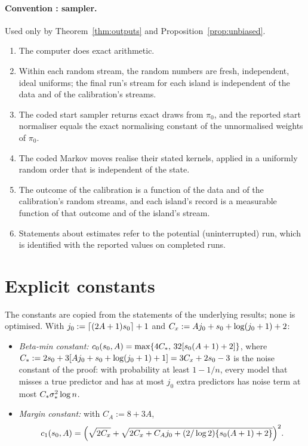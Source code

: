 \paragraph{Convention : sampler.} Used only by Theorem~\ref{thm:outputs} and Proposition~\ref{prop:unbiased}.
\begin{enumerate}[label=(\roman*),leftmargin=2em,itemsep=1pt]
  \item The computer does exact arithmetic.
  \item Within each random stream, the random numbers are fresh, independent, ideal uniforms; the final run's stream for
    each island is independent of the data and of the calibration's streams.
  \item The coded start sampler returns exact draws from $\pi_0$, and the reported start normaliser equals the exact
    normalising constant of the unnormalised weights of $\pi_0$.
  \item The coded Markov moves realise their stated kernels, applied in a uniformly random order that is independent of
    the state.
  \item The outcome of the calibration is a function of the data and of the calibration's random streams, and each island's
    record is a measurable function of that outcome and of the island's stream.
  \item Statements about estimates refer to the potential (uninterrupted) run, which is identified with the reported
    values on completed runs.
\end{enumerate}

\section{Explicit constants}\label{app:constants}

The constants are copied from the statements of the underlying results; none is optimised. With
$j_0:=\lceil(2A+1)s_0\rceil+1$ and $C_x:=Aj_0+s_0+\log(j_0+1)+2$:
\begin{itemize}[leftmargin=1.5em]
  \item \emph{Beta-min constant:} $c_0(s_0,A)=\max\{4C_*,\,32[s_0(A+1)+2]\}$, where
    $C_*:=2s_0+3[Aj_0+s_0+\log(j_0+1)+1]=3C_x+2s_0-3$ is the noise constant of the proof: with probability at least
    $1-1/n$, every model that misses a true predictor and has at most $j_0$ extra predictors has noise term at most
    $C_*\sigma_*^2\log n$.
  \item \emph{Margin constant:} with $C_A:=8+3A$,
    \[
      c_1(s_0,A)=\Big(\sqrt{2C_x}+\sqrt{2C_x+C_Aj_0+(2/\log2)\{s_0(A+1)+2\}}\Big)^2 .
    \]
\end{itemize}

